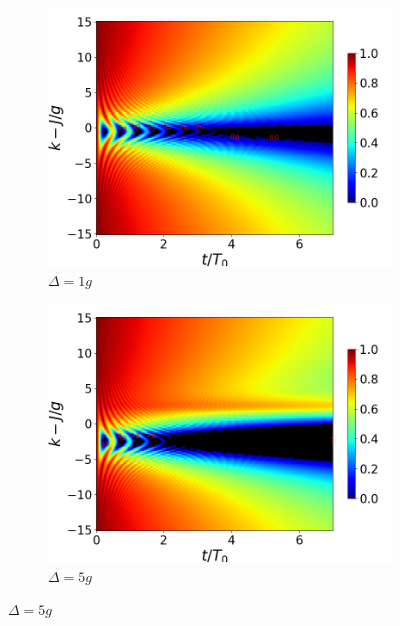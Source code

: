 \begin{figure}[h!]
    \centering
    \begin{subfigure}{0.49\textwidth}
        \includegraphics[width=\textwidth]{figuras/ch4/concu/k/eg0+ge0 d=1.0g x=0.0g J=15.0g gamma=0.25g concu k dis.png}
        \caption{$\Delta=1g$}
        \label{fig4:concu k d1}
    \end{subfigure}
    \hfill
    \begin{subfigure}{0.49\textwidth}
        \includegraphics[width=\textwidth]{figuras/ch4/concu/k/eg0+ge0 d=5.0g x=0.0g J=15.0g gamma=0.25g concu k dis.png}
        \caption{$\Delta=5g$}
        \label{fig4:concu k d2}
    \end{subfigure}
    \vfill

\end{figure}
